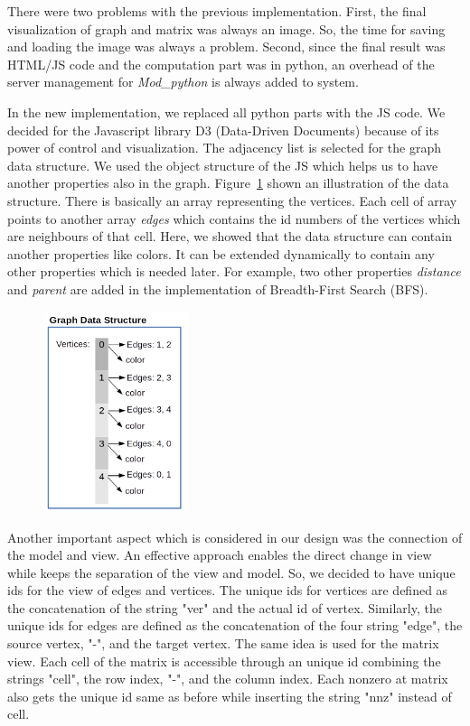 \documentclass[12pt, oneside]{book}
\begin{document}
There were two problems with the previous implementation. First, the final visualization
of graph and matrix was always an image. 
So, the time for saving and loading the image was always a problem.
Second, since the final result was HTML/JS code and the computation part was in python,
an overhead of the server management for \textit{Mod\_python} is always added to system.

In the new implementation, we replaced all python parts with the JS code.
We decided for the Javascript library D3 (Data-Driven Documents) 
because of its power of control and visualization.
The adjacency list is selected for the graph data structure.
We used the object structure of the JS which helps us to have another
properties also in the graph. Figure~\ref{f.graph-ds} shown an illustration
of the data structure. There is basically an array representing the vertices.
Each cell of array points to another array \textit{edges} which contains
the id numbers of the vertices which are neighbours of that cell.
Here, we showed that the data structure can contain another properties like colors.
It can be extended dynamically to contain any other properties which is needed later.
For example, two other properties \textit{distance} and \textit{parent} are added
in the implementation of Breadth-First Search (BFS).

\begin{figure}
\centering
\includegraphics[width=0.38\textwidth]{graph}
\caption{}
\label{f.graph-ds}
\end{figure}

Another important aspect which is considered in our design was the connection of the 
model and view. An effective approach enables the direct change in view while keeps the 
separation of the view and model. So, we decided to have unique ids for the view of
edges and vertices. The unique ids for vertices are defined as the concatenation of the
string "ver" and the actual id of vertex. Similarly, the unique ids for edges are
defined as the concatenation of the four string "edge", the source vertex, "-", 
and the target vertex. The same idea is used for the matrix view. Each cell of the matrix
is accessible through an unique id combining the strings "cell", the row index,
"-", and the column index. Each nonzero at matrix also gets the unique id same as before 
while inserting the string "nnz" instead of cell.
\end{document}
